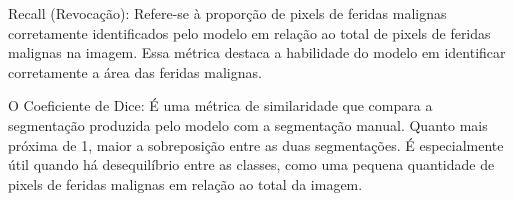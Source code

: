 Recall (Revocação): Refere-se à proporção de pixels de feridas malignas corretamente identificados pelo modelo em relação ao total de pixels de feridas malignas na imagem. Essa métrica destaca a habilidade do modelo em identificar corretamente a área das feridas malignas.

O Coeficiente de Dice: É uma métrica de similaridade que compara a segmentação produzida pelo modelo com a segmentação manual. Quanto mais próxima de 1, maior a sobreposição entre as duas segmentações. É especialmente útil quando há desequilíbrio entre as classes, como uma pequena quantidade de pixels de feridas malignas em relação ao total da imagem.